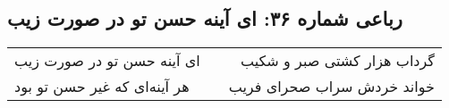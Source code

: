 \begin{center}
\section*{رباعی شماره ۳۶: ای آینه حسن تو در صورت زیب}
\label{sec:sh036}
\begin{longtable}{l p{0.5cm} r}
ای آینه حسن تو در صورت زیب
&&
گرداب هزار کشتی صبر و شکیب
\\
هر آینه‌ای که غیر حسن تو بود
&&
خواند خردش سراب صحرای فریب
\\
\end{longtable}
\end{center}
